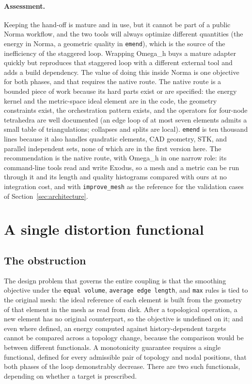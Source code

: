 \documentclass[11pt]{article}
\newcommand{\code}[1]{\texttt{#1}}
\newcommand{\omegah}{Omega\_h}
\begin{document}
\paragraph{Assessment.} Keeping the hand-off is mature and in use, but
it cannot be part of a public Norma workflow, and the two tools will
always optimize different quantities (the energy in Norma, a geometric
quality in \code{emend}), which is the source of the inefficiency of
the staggered loop. Wrapping \omegah{} buys a mature adapter quickly but
reproduces that staggered loop with a different external tool and adds
a build dependency. The value of doing this inside Norma is one
objective for both phases, and that requires the native route. The
native route is a bounded piece of work because its hard parts exist or
are specified: the energy kernel and the metric-space ideal element are
in the code, the geometry constraints exist, the orchestration pattern
exists, and the operators for four-node tetrahedra are well documented
(an edge loop of at most seven elements admits a small table of
triangulations; collapses and splits are local). \code{emend} is ten
thousand lines because it also handles quadratic elements, CAD
geometry, STK, and parallel independent sets, none of which are in the
first version here. The recommendation is the native route, with
\omegah{} in one narrow role: its command-line tools read and write
Exodus, so a mesh and a metric can be run through it and its length and
quality histograms compared with ours at no integration cost, and with
\code{improve\_mesh} as the reference for the validation cases of
Section~\ref{sec:architecture}.

\section{A single distortion functional}
\label{sec:intrinsic}

\subsection{The obstruction}

The design problem that governs the entire coupling is that the
smoothing objective under the \code{equal volume}, \code{average edge
length}, and \code{max} rules is tied to the original mesh: the ideal
reference of each element is built from the geometry of that element in
the mesh as read from disk. After a topological operation, a new element
has no original counterpart, so the objective is undefined on it; and
even where defined, an energy computed against history-dependent targets
cannot be compared across a topology change, because the comparison would
be between different functionals. A monotonicity guarantee requires a
single functional, defined for every admissible pair of topology and
nodal positions, that both phases of the loop demonstrably decrease.
There are two such functionals, depending on whether a target is
prescribed.
\end{document}
